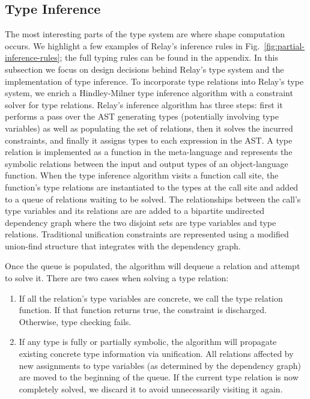   \subsection{Type Inference}
  \label{sec:inference}

  The most interesting parts of the type system
    are where shape computation occurs.
  We highlight a few examples of Relay's inference
    rules in Fig.~\ref{fig:partial-inference-rules};
    the full typing rules can be found in the appendix.
  In this subsection we focus on design decisions behind Relay's type system
    and the implementation of type inference.
  To incorporate type relations into Relay's type system, we enrich
    a Hindley-Milner type inference algorithm with
    a constraint solver for type relations.
  Relay's inference algorithm has three steps: first it
    performs a pass over the AST generating types (potentially involving type variables)
    as well as populating the set of relations,
    then it solves the incurred constraints,
    and finally it assigns types to each expression in the AST.
  A type relation is implemented as a function in the
    meta-language and represents the symbolic relations between
    the input and output types of an object-language function.
  When the type inference algorithm visits a function call site, the function's type relations are
    instantiated to the types at the call site and added to a queue of relations waiting to be
    solved.
  The relationships between the call's type variables and its relations are are added to a
    bipartite undirected dependency graph where the two disjoint sets are type variables and type relations.
  Traditional unification constraints are represented using a modified union-find structure that
    integrates with the dependency graph.

  Once the queue is populated, the algorithm will dequeue a relation and attempt to solve it.
  There are two cases when solving a type relation:
  \begin{enumerate}
    \item If all the relation's type variables
    are concrete, we call the type relation function. If that function returns true, the
    constraint is discharged. Otherwise, type checking fails.
    \item If any type is fully or partially symbolic, the
      algorithm will propagate
      existing concrete type information via unification.
    All relations affected by new assignments to type
      variables (as determined by the dependency graph)
      are moved to the beginning of the queue.
    If the current type relation is now completely solved, we
    discard it to avoid unnecessarily visiting it again.
  \end{enumerate}

